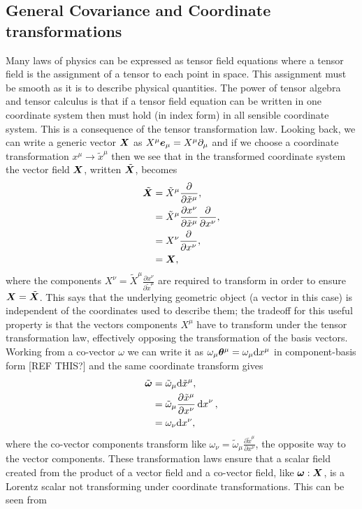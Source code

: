 \subsection{General Covariance and Coordinate transformations}\label{intro:sec:cov}
Many laws of physics can be expressed as tensor field equations where a tensor field is the assignment of a tensor to each point in space. This assignment must be smooth as it is to describe physical quantities. The power of tensor algebra and tensor calculus is that if a tensor field equation can be written in one coordinate system then must hold (in index form) in all sensible coordinate system. This is a consequence of the tensor transformation law. Looking back, we can write a generic vector $\boldsymbol{X}$ as $X^\mu \boldsymbol{e}_\mu = X^\mu \partial_\mu$ and if we choose a coordinate transformation $x^\mu \rightarrow \tilde{x}^\mu$ then we see that in the transformed coordinate system the vector field $\boldsymbol{X}$, written $\tilde{\boldsymbol{X}}$, becomes
\begin{align}
\tilde{\boldsymbol X} &= \tilde{X}^\mu\frac{\partial}{\partial \tilde{x}^\mu}, \\
              &= \tilde{X}^\mu\frac{\partial x^\nu}{\partial \tilde{x}^\mu}\frac{\partial}{\partial {x}^\nu}, \\
              &= X^\nu \frac{\partial}{\partial x^\nu}, \\
              &= \boldsymbol{X}, \
\end{align}
where the components $X^\nu = \tilde{X}^\mu\frac{\partial x^\nu}{\partial \tilde{x}^\mu}$ are required to transform in order to ensure $\boldsymbol{X}=\tilde{\boldsymbol{X}}$. This says that the underlying geometric object (a vector in this case) is independent of the coordinates used to describe them; the tradeoff for this useful property is that the vectors components $X^\mu$ have to transform under the tensor transformation law, effectively opposing the transformation of the basis vectors. Working from a co-vector $\omega$ we can write it as $\omega_\mu \boldsymbol{\theta}^\mu = \omega_\mu \dd x^\mu$ in component-basis form [REF THIS?] and the same coordinate transform gives
\begin{align}
\tilde{\boldsymbol{\omega}} &= \tilde{\omega}_\mu \dd \tilde{x}^\mu , \\
                    &= \tilde{\omega}_\mu \frac{\partial \tilde{x}^\mu}{\partial x^\nu}\dd {x}^\nu , \\
                    &= \omega_\nu \dd x^\nu,
\end{align}
where the co-vector components transform like $\omega_\nu= \tilde{\omega}_\mu \frac{\partial \tilde{x}^\mu}{\partial x^\nu}$, the opposite way to the vector components. These transformation laws ensure that a scalar field created from the product of a vector field and a co-vector field, like $\boldsymbol{\omega}:\boldsymbol{X}$, is a Lorentz scalar not transforming under coordinate transformations. This can be seen from
